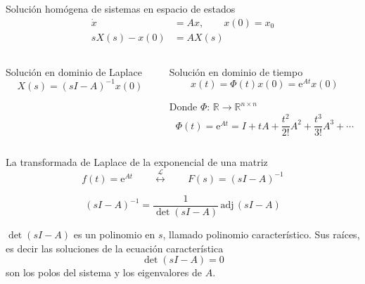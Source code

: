 \documentclass[presentation,aspectratio=169]{beamer}
\begin{document}
\begin{frame}[label={sec:org2bc4f62}]{Solución homógena de sistemas en espacio de estados}
\small
\begin{align*}
\dot{x} &= Ax, \qquad x(0) = x_0\\
 sX(s) - x(0) &= AX(s)
 \end{align*}
\pause

\begin{columns}
\begin{column}{0.5\columnwidth}
\begin{block}{Solución en dominio de Laplace}
\[X(s) = (sI-A)^{-1}x(0)\]

\pause
\end{block}
\end{column}

\begin{column}{0.5\columnwidth}
\begin{block}{Solución en dominio de tiempo}
\[ x(t) = \Phi(t)x(0) = \mathrm{e}^{At}x(0)\]

Donde  \(\Phi:\,\mathbb{R} \rightarrow \mathbb{R}^{n\times n}\) \[\Phi(t)=\mathrm{e}^{At} = I + tA + \frac{t^2}{2!}A^2 + \frac{t^3}{3!}A^3 + \cdots\] 
\end{block}
\end{column}
\end{columns}
\end{frame}

\begin{frame}[label={sec:orgb790a26}]{La transformada de Laplace de la exponencial de una matriz}
\[ f(t)=\mathrm{e}^{At} \qquad \overset{\mathcal{L}}{\longleftrightarrow} \qquad F(s) = (sI-A)^{-1} \]

\pause

\[(sI-A)^{-1} = \frac{1}{\det (sI-A)} \, \text{adj}\, (sI-A) \]

\(\det (sI-A)\) es un polinomio en \(s\), llamado \alert{polinomio característico}. Sus raíces, es decir las soluciones de la \alert{ecuación característica}
\[ \det(sI-A) = 0\]
son los \alert{polos} del sistema y los eigenvalores de \(A\).
\end{frame}
\end{document}
